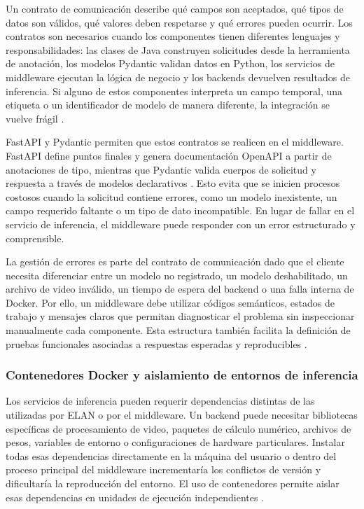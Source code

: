 Un contrato de comunicación describe qué campos son aceptados, qué tipos de datos son válidos, qué valores deben respetarse y qué errores pueden ocurrir. Los contratos son necesarios cuando los componentes tienen diferentes lenguajes y responsabilidades: las clases de Java construyen solicitudes desde la herramienta de anotación, los modelos Pydantic validan datos en Python, los servicios de middleware ejecutan la lógica de negocio y los backends devuelven resultados de inferencia. Si alguno de estos componentes interpreta un campo temporal, una etiqueta o un identificador de modelo de manera diferente, la integración se vuelve frágil \cite{fielding2000rest}.

FastAPI y Pydantic permiten que estos contratos se realicen en el middleware. FastAPI define puntos finales y genera documentación OpenAPI a partir de anotaciones de tipo, mientras que Pydantic valida cuerpos de solicitud y respuesta a través de modelos declarativos \cite{fastapi2026features,pydantic2026models}. Esto evita que se inicien procesos costosos cuando la solicitud contiene errores, como un modelo inexistente, un campo requerido faltante o un tipo de dato incompatible. En lugar de fallar en el servicio de inferencia, el middleware puede responder con un error estructurado y comprensible.

La gestión de errores es parte del contrato de comunicación dado que el cliente necesita diferenciar entre un modelo no registrado, un modelo deshabilitado, un archivo de video inválido, un tiempo de espera del backend o una falla interna de Docker. Por ello, un middleware debe utilizar códigos semánticos, estados de trabajo y mensajes claros que permitan diagnosticar el problema sin inspeccionar manualmente cada componente. Esta estructura también facilita la definición de pruebas funcionales asociadas a respuestas esperadas y reproducibles \cite{fastapi2026features,pydantic2026models}.

\subsubsection{Contenedores Docker y aislamiento de entornos de inferencia}

Los servicios de inferencia pueden requerir dependencias distintas de las utilizadas por ELAN o por el middleware. Un backend puede necesitar bibliotecas específicas de procesamiento de video, paquetes de cálculo numérico, archivos de pesos, variables de entorno o configuraciones de hardware particulares. Instalar todas esas dependencias directamente en la máquina del usuario o dentro del proceso principal del middleware incrementaría los conflictos de versión y dificultaría la reproducción del entorno. El uso de contenedores permite aislar esas dependencias en unidades de ejecución independientes \cite{docker2026overview}.

